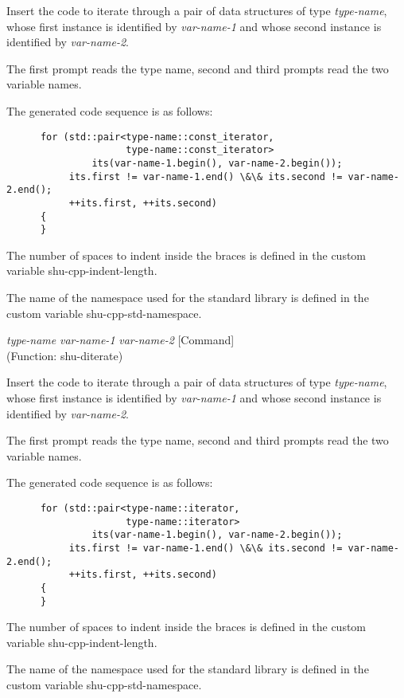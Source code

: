 \begin{doc-string}
Insert the code to iterate through a pair of data structures of type
\emph{type-name}, whose first instance is identified by \emph{var-name-1} and whose second
instance is identified by \emph{var-name-2}.

The first prompt reads the type name, second and third prompts read the two
variable names.

The generated code sequence is as follows:

\small{\begin{verbatim}
      for (std::pair<type-name::const_iterator,
                     type-name::const_iterator>
               its(var-name-1.begin(), var-name-2.begin());
           its.first != var-name-1.end() \&\& its.second != var-name-2.end();
           ++its.first, ++its.second)
      {
      }
\end{verbatim}}

The number of spaces to indent inside the braces is defined in the custom
variable shu-cpp-indent-length.

The name of the namespace used for the standard library is defined in the custom
variable shu-cpp-std-namespace.
\end{doc-string}

\vspace{1em}
\noindent
{}
\usebox{\funcname}\emph{type-name} \emph{var-name-1} \emph{var-name-2}
 \hfill [Command]\\%
 (Function: shu-diterate)

\begin{doc-string}
Insert the code to iterate through a pair of data structures of type
\emph{type-name}, whose first instance is identified by \emph{var-name-1} and whose second
instance is identified by \emph{var-name-2}.

The first prompt reads the type name, second and third prompts read the two
variable names.

The generated code sequence is as follows:

\small{\begin{verbatim}
      for (std::pair<type-name::iterator,
                     type-name::iterator>
               its(var-name-1.begin(), var-name-2.begin());
           its.first != var-name-1.end() \&\& its.second != var-name-2.end();
           ++its.first, ++its.second)
      {
      }
\end{verbatim}}

The number of spaces to indent inside the braces is defined in the custom
variable shu-cpp-indent-length.

The name of the namespace used for the standard library is defined in the custom
variable shu-cpp-std-namespace.
\end{doc-string}

